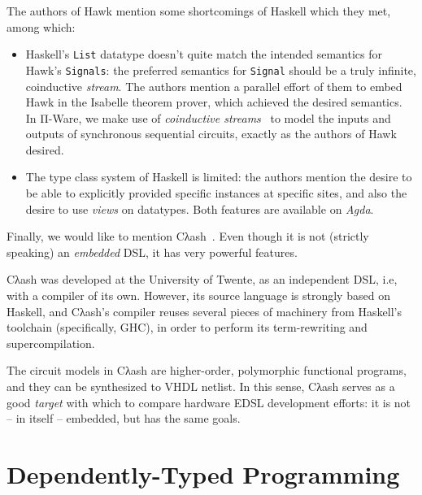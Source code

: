             The authors of Hawk mention some shortcomings of Haskell which they met, among which:

            \begin{itemize}
                \item Haskell's \texttt{List} datatype doesn't quite match
                    the intended semantics for Hawk's \texttt{Signals}:
                    the preferred semantics for \texttt{Signal} should be a truly infinite, coinductive \emph{stream}.
                    The authors mention a parallel effort of them to embed Hawk in the Isabelle theorem prover,
                    which achieved the desired semantics.
                    In Π-Ware, we make use of \emph{coinductive streams}~\cite{introduction-coalgebra-jacobs}
                    to model the inputs and outputs of synchronous sequential circuits,
                    exactly as the authors of Hawk desired.
                \item The type class system of Haskell is limited: the authors mention the desire to be able
                    to explicitly provided specific instances at specific sites,
                    and also the desire to use \emph{views} on datatypes.
                    Both features are available on \emph{Agda}.
            \end{itemize}

            Finally, we would like to mention Cλash~\cite{clash-baaij}.
            Even though it is not (strictly speaking) an \emph{embedded} \ac{DSL},
            it has very powerful features.

            Cλash was developed at the University of Twente,
            as an independent \ac{DSL}, i.e, with a compiler of its own.
            However, its source language is strongly based on Haskell, and Cλash's compiler
            reuses several pieces of machinery from Haskell's toolchain (specifically, GHC),
            in order to perform its term-rewriting and supercompilation.

            The circuit models in Cλash are higher-order, polymorphic functional programs,
            and they can be synthesized to \ac{VHDL} netlist.
            In this sense, Cλash serves as a good \emph{target} with which to compare hardware
            \ac{EDSL} development efforts: it is not -- in itself -- embedded, but has the same goals.


    \section{Dependently-Typed Programming}
    \label{sec:dtp}

